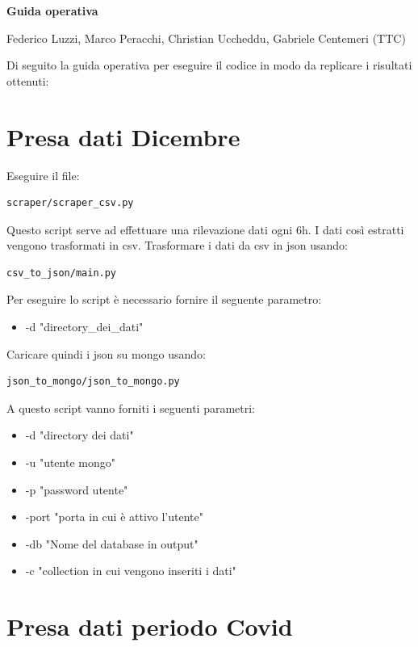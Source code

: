 \documentclass[10pt, a4paper,openany]{article}
\begin{document}
\begin{center}
\large\textbf{Guida operativa}
\end{center}

\begin{center}
 Federico Luzzi,  Marco Peracchi, Christian Uccheddu, Gabriele Centemeri (TTC)
\end{center}
Di seguito la guida operativa per eseguire il codice in modo da replicare i risultati ottenuti:

\section*{Presa dati Dicembre}

Eseguire il file:

\begin{verbatim}
scraper/scraper_csv.py
\end{verbatim}
Questo script serve ad effettuare una rilevazione dati ogni 6h. I dati così estratti vengono trasformati in csv.
Trasformare i dati da csv in json usando: 

\begin{verbatim}
csv_to_json/main.py
\end{verbatim}
Per eseguire lo script è necessario fornire il seguente parametro:
\begin{itemize}
	\item -d "directory\_dei\_dati"
\end{itemize}
Caricare quindi i json su mongo usando: 

\begin{verbatim}
json_to_mongo/json_to_mongo.py
\end{verbatim}
A questo script vanno forniti i seguenti parametri:

\begin{itemize}
	\item -d "directory dei dati"
	\item -u "utente mongo"
	\item -p "password utente"
	\item -port "porta in cui è attivo l'utente"
	\item-db "Nome del database in output"
	\item -c "collection in cui vengono inseriti i dati"
\end{itemize}

\section*{Presa dati periodo Covid}
\end{document}
